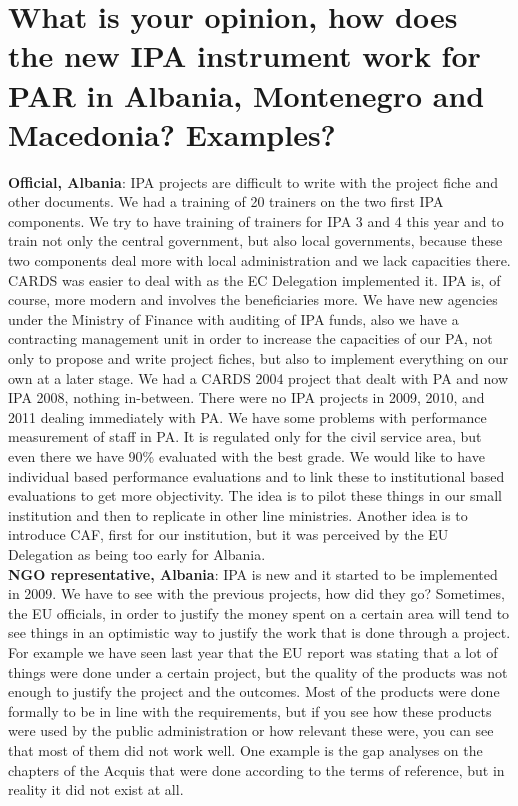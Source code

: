\section{ What is your opinion, how does the new IPA instrument work for PAR in Albania, Montenegro and Macedonia? Examples?}
\label{sec:par examples}
\textbf{Official, Albania}: IPA projects are difficult to write with the project fiche and other documents. We had a training of 20 trainers on the two first IPA components. We try to have training of trainers for IPA 3 and 4 this year and to train not only the central government, but also local governments, because these two components deal more with local administration and we lack capacities there. CARDS was easier to deal with as the EC Delegation implemented it. IPA is, of course, more modern and involves the beneficiaries more. We have new agencies under the Ministry of Finance with auditing of IPA funds, also we have a contracting management unit in order to increase the capacities of our PA, not only to propose and write project fiches, but also to implement everything on our own at a later stage. We had a CARDS 2004 project that dealt with PA and now IPA 2008, nothing in-between. There were no IPA projects in 2009, 2010, and 2011 dealing immediately with PA. We have some problems with performance measurement of staff in PA. It is regulated only for the civil service area, but even there we have 90\% evaluated with the best grade. We would like to have individual based performance evaluations and to link these to institutional based evaluations to get more objectivity. The idea is to pilot these things in our small institution and then to replicate in other line ministries. Another idea is to introduce CAF, first for our institution, but it was perceived by the EU Delegation as being too early for Albania. \\
\textbf{NGO representative, Albania}: IPA is new and it started to be implemented in 2009. We have to see with the previous projects, how did they go? Sometimes, the EU officials, in order to justify the money spent on a certain area will tend to see things in an optimistic way to justify the work that is done through a project. For example we have seen last year that the EU report was stating that a lot of things were done under a certain project, but the quality of the products was not enough to justify the project and the outcomes. Most of the products were done formally to be in line with the requirements, but if you see how these products were used by the public administration or how relevant these were, you can see that most of them did not work well. One example is the gap analyses on the chapters of the Acquis that were done according to the terms of reference, but in reality it did not exist at all. \\
